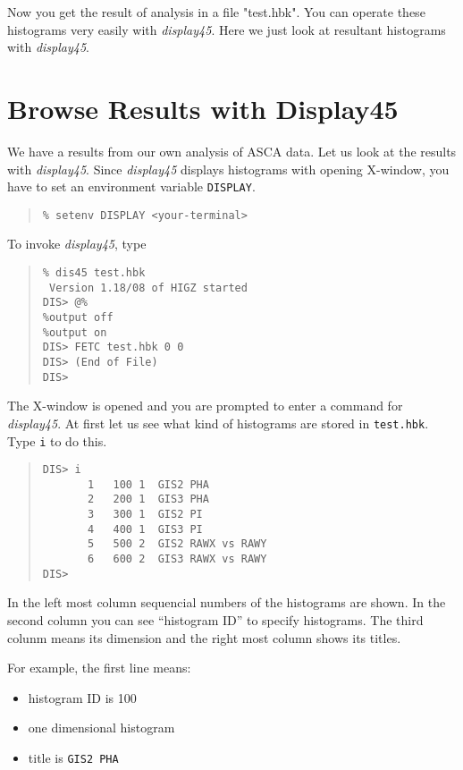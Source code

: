 Now you get the result of analysis in a file "test.hbk".
You can operate these histograms very easily
with {\em display45}.
Here
we just look at resultant histograms with {\em display45}.

\section{Browse Results with Display45}
We have a results from our own analysis of ASCA data.
Let us look at the results with {\em display45}.
Since {\em display45} displays histograms with opening X-window,
you have to set an environment variable {\tt DISPLAY}.

\begin{quote}\baselineskip 3.2mm\begin{verbatim}
% setenv DISPLAY <your-terminal>
\end{verbatim}\end{quote}

To invoke {\em display45}, type

\begin{quote}\baselineskip 3.2mm\begin{verbatim}
% dis45 test.hbk
 Version 1.18/08 of HIGZ started
DIS> @%
%output off
%output on
DIS> FETC test.hbk 0 0
DIS> (End of File)
DIS> 
\end{verbatim}\end{quote}

The X-window is opened
and you are prompted to enter a command for {\em display45}.
At first
let us see what kind of histograms are stored in {\tt test.hbk}.
Type {\tt i} to do this.

\begin{quote}\baselineskip 3.2mm\begin{verbatim}
DIS> i     
       1   100 1  GIS2 PHA
       2   200 1  GIS3 PHA
       3   300 1  GIS2 PI
       4   400 1  GIS3 PI
       5   500 2  GIS2 RAWX vs RAWY
       6   600 2  GIS3 RAWX vs RAWY
DIS> 
\end{verbatim}\end{quote}

In the left most column sequencial numbers of the histograms are shown.
In the second column
you can see ``histogram ID'' to specify histograms.
The third colunm means its dimension
and the right most column shows its titles.

For example,
the first line means:
\begin{itemize}
  \item histogram ID is 100
  \item one dimensional histogram
  \item title is {\tt GIS2 PHA}
\end{itemize}

